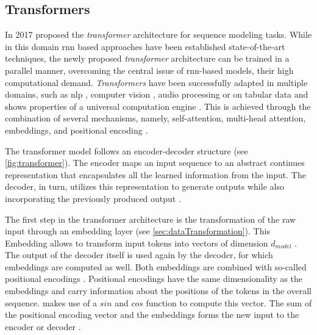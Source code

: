 \subsection{Transformers}
\label{ch:preliminaries-transformers}

In 2017 \cite{vaswani2017AttentionAllYou} proposed the \textit{transformer} architecture for sequence modeling tasks.
While in this domain \gls{rnn} based approaches have been established state-of-the-art techniques, the newly proposed \textit{transformer} architecture can be trained in a parallel manner,
overcoming the central issue of \gls{rnn}-based models, their high computational demand.
\textit{Transformers} have been successfully adapted in multiple domains, such as \gls{nlp} \cite{gillioz2020OverviewTransformerbasedModels}, computer vision \cite{khan2022TransformersVisionSurvey}, audio processing \cite{gong2022SSASTSelfSupervisedAudio} or on tabular data \cite{huang2020TabTransformerTabularData} 
and shows properties of a universal computation engine \cite{lu2021PretrainedTransformersUniversal, lin2022SurveyTransformers}.
This is achieved through the combination of several mechanisms, namely, self-attention, multi-head attention, embeddings, and positional encoding \cite{vaswani2017AttentionAllYou}.

The transformer model follows an encoder-decoder structure (see \autoref{fig:transformer}).
The encoder maps an input sequence to an abstract continues representation that encapsulates all the learned information from the input.
The decoder, in turn, utilizes this representation to generate outputs while also incorporating the previously produced output \cite{vaswani2017AttentionAllYou}.

The first step in the transformer architecture is the transformation of the raw input through an embedding layer (see \autoref{sec:dataTransformation}).
This Embedding allows to transform input tokens into vectors of dimension $d_{model}$ \cite{vaswani2017AttentionAllYou}.
The output of the decoder itself is used again by the decoder, for which embeddings are computed as well.
Both embeddings are combined with so-called positional encodings \cite{vaswani2017AttentionAllYou, lin2022SurveyTransformers}.
Positional encodings have the same dimensionality as the embeddings and carry information about the positions of the tokens in the overall sequence.
\cite{vaswani2017AttentionAllYou} makes use of a $sin$ and $cos$ function to compute this vector.
The sum of the positional encoding vector and the embeddings forms the new input to the encoder or decoder \cite{vaswani2017AttentionAllYou}.

